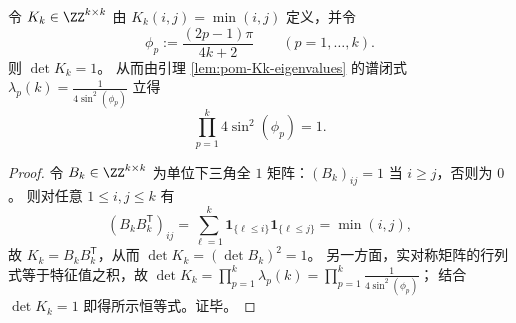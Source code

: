 
\begin{corollary}[整数 Gram 归一化的谱乘积刚性：\texorpdfstring{$\prod_{p=1}^k4\sin^2(\phi_p)=1$}{prod 4 sin^2(phi)=1}]\label{cor:pom-Kk-det-sine-product-normalization}
令 \(K_k\in\ZZ^{k\times k}\) 由 \(K_k(i,j)=\min(i,j)\) 定义，并令
\[
\phi_p:=\frac{(2p-1)\pi}{4k+2}\qquad(p=1,\dots,k).
\]
则 \(\det K_k=1\)。
从而由引理 \ref{lem:pom-Kk-eigenvalues} 的谱闭式
\(\lambda_p(k)=\frac{1}{4\sin^2(\phi_p)}\) 立得
\[
\boxed{\;\prod_{p=1}^{k}4\sin^2(\phi_p)=1.\;}
\]
\end{corollary}
\begin{proof}
令 \(B_k\in\ZZ^{k\times k}\) 为单位下三角全 \(1\) 矩阵：\((B_k)_{ij}=1\) 当 \(i\ge j\)，否则为 \(0\)。
则对任意 \(1\le i,j\le k\) 有
\[
(B_kB_k^{\mathsf T})_{ij}=\sum_{\ell=1}^{k}\mathbf{1}_{\{\ell\le i\}}\mathbf{1}_{\{\ell\le j\}}=\min(i,j),
\]
故 \(K_k=B_kB_k^{\mathsf T}\)，从而 \(\det K_k=(\det B_k)^2=1\)。
另一方面，实对称矩阵的行列式等于特征值之积，故
\(
\det K_k=\prod_{p=1}^{k}\lambda_p(k)
=\prod_{p=1}^{k}\frac{1}{4\sin^2(\phi_p)}
\)；
结合 \(\det K_k=1\) 即得所示恒等式。证毕。
\end{proof}

